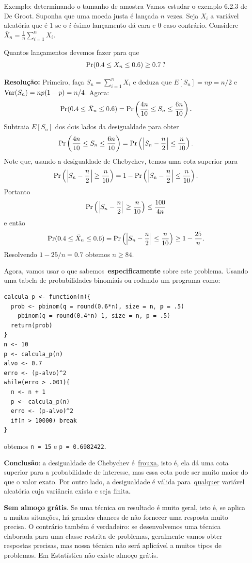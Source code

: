 \begin{frame}{Exemplo: determinando o tamanho de amostra}
Vamos estudar o exemplo 6.2.3 de De Groot.
Suponha  que uma moeda justa é lançada $n$ vezes.
Seja $X_i$ a variável aleatória que é $1$ se o $i$-ésimo lançamento dá cara e $0$ caso contrário.
Considere $\bar{X}_n = \frac{1}{n} \sum_{i=1}^n X_i$.
\begin{pergunta}
Quantos lançamentos devemos fazer para que 
$$ \operatorname{Pr}(0.4 \leq \bar{X}_n \leq 0.6) \geq 0.7\: ?$$
\end{pergunta}
\textbf{Resolução:} Primeiro, faça $S_n = \sum_{i=1}^n X_i$ e deduza que $E[S_n] = np = n/2$ e $\operatorname{Var}(S_n) = n p(1-p) = n/4$.
Agora:
$$ \operatorname{Pr}(0.4 \leq \bar{X}_n \leq 0.6) = \operatorname{Pr}\left(\frac{4n}{10} \leq S_n  \leq \frac{6n}{10} \right).$$
Subtraia $E[S_n]$ dos dois lados da desigualdade para obter
$$ \operatorname{Pr}\left(\frac{4n}{10} \leq S_n  \leq \frac{6n}{10} \right) = \operatorname{Pr} \left(\left|S_n - \frac{n}{2} \right|\leq \frac{n}{10} \right) .$$
Note que, usando a desigualdade de Chebychev, temos uma cota superior para 
$$\operatorname{Pr} \left(\left|S_n - \frac{n}{2} \right|\geq \frac{n}{10} \right) = 1 - \operatorname{Pr} \left(\left|S_n - \frac{n}{2} \right|\leq \frac{n}{10} \right).$$
Portanto
$$\operatorname{Pr} \left(\left|S_n - \frac{n}{2} \right|\geq \frac{n}{10} \right) \leq \frac{100}{4n}$$ 
e então
$$ \operatorname{Pr}(0.4 \leq \bar{X}_n \leq 0.6) = \operatorname{Pr} \left(\left|S_n - \frac{n}{2} \right|\leq \frac{n}{10} \right) \geq 1 - \frac{25}{n}.$$
Resolvendo $ 1 - 25/n = 0.7$ obtemos $n \geq 84$.

\framebreak
Agora, vamos usar o que sabemos~\textbf{especificamente} sobre este problema.
Usando uma tabela de probabilidades binomiais ou rodando um programa como:
\begin{verbatim}
calcula_p <- function(n){
  prob <- pbinom(q = round(0.6*n), size = n, p = .5) 
  - pbinom(q = round(0.4*n)-1, size = n, p = .5)
  return(prob)
}
n <- 10
p <- calcula_p(n)
alvo <- 0.7
erro <- (p-alvo)^2
while(erro > .001){
  n <- n + 1
  p <- calcula_p(n)
  erro <- (p-alvo)^2
  if(n > 10000) break
}
\end{verbatim}
obtemos \verb|n = 15| e \verb|p = 0.6982422|.

\textbf{Conclusão}: a desigualdade de Chebychev é~\underline{frouxa}, isto é, ela dá uma cota superior para a probabilidade de interesse, mas essa cota pode ser muito maior do que o valor exato.
Por outro lado, a desigualdade é válida para~\underline{qualquer} variável aleatória cuja variância exista e seja finita.

\begin{ideia}
\label{idea:no_free_lunch}
 \textbf{Sem almoço grátis}.
 Se uma técnica ou resultado é muito geral, isto é, se aplica a muitas situações, há grandes chances de não fornecer uma resposta muito precisa.
 O contrário também é verdadeiro: se desenvolvemos uma técnica elaborada para uma classe restrita de problemas, geralmente vamos obter respostas precisas, mas nossa técnica não será aplicável a muitos tipos de problemas.
 Em Estatística não existe almoço grátis.
\end{ideia}

\end{frame}
